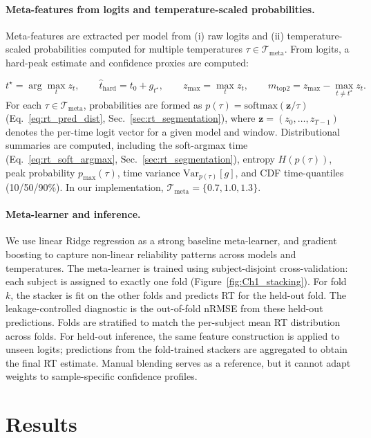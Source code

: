 \documentclass[12pt]{article}
\begin{document}
\paragraph{Meta-features from logits and temperature-scaled probabilities.}
Meta-features are extracted per model from (i) raw logits and (ii) temperature-scaled probabilities computed for multiple
temperatures $\tau\in\mathcal{T}_{\text{meta}}$. From logits, a hard-peak estimate and confidence proxies are computed:

\begin{equation}
\label{eq:rt_stacking_logit_features}
t^\star = \arg\max_{t} z_t,\qquad
\hat t_{\mathrm{hard}} = t_0 + g_{t^\star},\qquad
z_{\max} = \max_t z_t,\qquad
m_{\mathrm{top2}} = z_{\max} - \max_{t\neq t^\star} z_t.
\end{equation}
For each $\tau\in\mathcal{T}_{\text{meta}}$, probabilities are formed as $p(\tau)=\mathrm{softmax}(\mathbf{z}/\tau)$ (Eq.~\ref{eq:rt_pred_dist}, Sec.~\ref{sec:rt_segmentation}), where $\mathbf{z}=(z_0,\dots,z_{T-1})$ denotes the per-time logit vector for a given model and window. Distributional summaries
are computed, including the soft-argmax time (Eq.~\ref{eq:rt_soft_argmax}, Sec.~\ref{sec:rt_segmentation}), entropy $H(p(\tau))$, peak probability
$p_{\max}(\tau)$, time variance $\mathrm{Var}_{p(\tau)}[g]$, and CDF time-quantiles (10/50/90\%). In our implementation,
$\mathcal{T}_{\text{meta}}=\{0.7,1.0,1.3\}$.

\paragraph{Meta-learner and inference.}
We use linear Ridge regression as a strong baseline meta-learner, and gradient boosting to capture non-linear reliability
patterns across models and temperatures. The meta-learner is trained using subject-disjoint cross-validation: each subject is assigned to exactly one fold (Figure~\ref{fig:Ch1_stacking}). For fold $k$, the stacker is fit on the other folds and predicts RT for the held-out fold. The leakage-controlled diagnostic is the out-of-fold nRMSE from these held-out predictions. Folds are stratified to match the per-subject mean RT distribution across folds. For held-out inference, the same feature construction is applied to unseen logits; predictions from the fold-trained stackers are aggregated to obtain the final RT estimate.
Manual blending serves as a reference, but it cannot adapt weights to sample-specific confidence profiles.


\section{Results}
\end{document}
